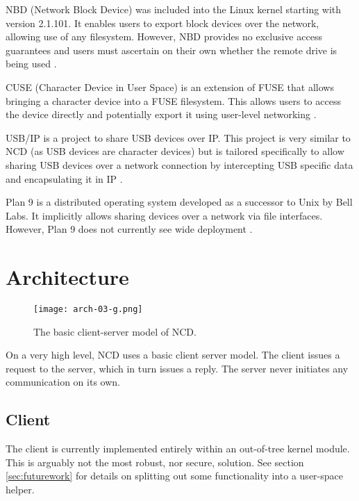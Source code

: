 \documentclass[11pt,twocolumn]{article}
\begin{document}
NBD (Network Block Device) was included into the Linux kernel starting
with version 2.1.101. It enables users to export block devices over the
network, allowing use of any filesystem. However, NBD provides no
exclusive access guarantees and users must ascertain on their own
whether the remote drive is being used \cite{nbd-source}.

CUSE (Character Device in User Space) is an extension of FUSE that
allows bringing a character device into a FUSE filesystem.  This allows
users to access the device directly and potentially export it using
user-level networking \cite{cuse-article}.

USB/IP is a project to share USB devices over IP. This project is
very similar to NCD (as USB devices are character devices) but is
tailored specifically to allow sharing USB devices over a
network connection by intercepting USB specific data and encapsulating
it in IP \cite{usbip-source}.

Plan 9 is a distributed operating system developed as a successor to
Unix by Bell Labs.  It implicitly allows sharing devices over a
network via file interfaces. However, Plan 9 does not currently see
wide deployment \cite{plan9-pike}.


\section{Architecture}
\label{sec:architecture}

\begin{figure}[h]
  \centering
  \texttt{[image: arch-03-g.png]}
  \caption{The basic client-server model of NCD.}
  \label{fig:architecture}
\end{figure}

On a very high level, NCD uses a basic client server model. The client
issues a request to the server, which in turn issues a reply. The
server never initiates any communication on its own.

\subsection{Client}

The client is currently implemented entirely within an out-of-tree kernel
module. This is arguably not the most robust, nor secure, solution. See
section \ref{sec:futurework} for details on splitting out some functionality
into a user-space helper.
\end{document}
